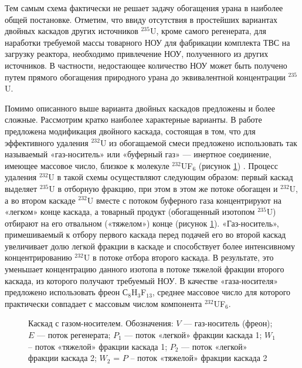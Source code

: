 Тем самым схема фактически не решает задачу обогащения урана в наиболее общей постановке.
Отметим, что ввиду отсутствия в простейших вариантах двойных каскадов других источников $^{235}$U, кроме самого регенерата, для наработки требуемой массы товарного НОУ для фабрикации комплекта ТВС на загрузку реактора, необходимо привлечение НОУ, полученного из других источников. В частности, недостающее количество НОУ может быть получено путем прямого обогащения природного урана до эквивалентной концентрации $^{235}$U.

Помимо описанного выше варианта двойных каскадов предложены и более сложные. Рассмотрим кратко наиболее характерные варианты.
В работе \cite{prusakovKorrekciyaIzotopnogoSostava2008} предложена модификация двойного каскада, состоящая в том, что для эффективного удаления $^{232}$U из обогащаемой смеси предложено использовать так называемый «газ-носитель» или «буферный газ» --- инертное соединение, имеющее массовое число, близкое к молекуле $^{232}$UF$_{6}$ (рисунок \ref{p2_gas}) \cite{orlovWayObtainUranium2015, orlovDesublimationPurificationTransporting2017}. Процесс удаления $^{232}$U в такой схемы осуществляют следующим образом: первый каскад выделяет $^{235}$U в отборную фракцию, при этом в этом же потоке обогащен и $^{232}$U, а во втором каскаде $^{232}$U вместе с потоком буферного газа концентрируют на «легком» конце каскада, а товарный продукт (обогащенный изотопом $^{235}$U) отбирают на его отвальном («тяжелом») конце (рисунок \ref{p2_gas}). «Газ-носитель», примешиваемый к отбору первого каскада перед подачей его во второй каскад  увеличивает долю легкой фракции в каскаде и способствует более интенсивному концентрированию $^{232}$U в потоке отбора второго каскада. В результате, это уменьшает концентрацию данного изотопа в потоке тяжелой фракции второго каскада, из которого получают требуемый НОУ. В качестве «газа-носителя» предложено использовать фреон С$_{8}$H$_{3}$F$_{13}$, среднее массовое число для которого практически совпадает с массовым числом компонента $^{232}$UF$_{6}$.

\begin{figure}[ht]
  \caption{Каскад с газом-носителем. Обозначения: $V$ --- газ-носитель (фреон); $E$ --- поток регенерата; $P_1$ --- поток «легкой» фракции каскада 1; $W_1$ – поток «тяжелой» фракции каскада 1; $P_2$ --- поток «легкой» фракции каскада 2; $W_2$ = $P$ – поток «тяжелой» фракции каскада 2}\label{p2_gas}
\end{figure}

